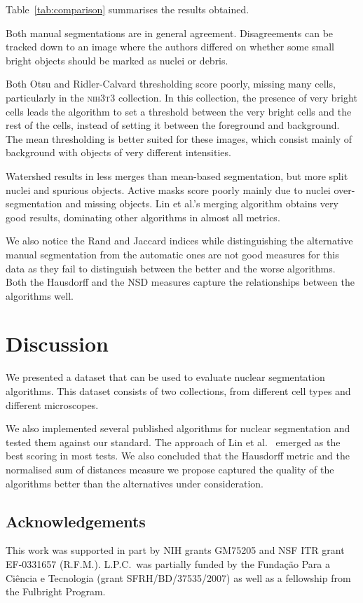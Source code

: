 \documentclass{article}
\newcommand*{\ttt}{\textsc{nih}{\footnotesize 3}\textsc{t}{\footnotesize 3}}
\begin{document}
Table~\ref{tab:comparison} summarises the results obtained.

Both manual segmentations are in general agreement. Disagreements can be tracked down to an image where the authors differed on whether some small bright objects should be marked as nuclei or debris.

Both Otsu and Ridler-Calvard thresholding score poorly, missing many cells, particularly in the \ttt{} collection. In this collection, the presence of very bright cells leads the algorithm to set a threshold between the very bright cells and the rest of the cells, instead of setting it between the foreground and background. The mean thresholding is better suited for these images, which consist mainly of background with objects of very different intensities.

Watershed results in less merges than mean-based segmentation, but more split nuclei and spurious objects. Active masks score poorly mainly due to nuclei over-segmentation and missing objects. Lin et al.'s merging algorithm obtains very good results, dominating other algorithms in almost all metrics.

We also notice the Rand and Jaccard indices while distinguishing the alternative manual segmentation from the automatic ones are not good measures for this data as they fail to distinguish between the better and the worse algorithms. Both the Hausdorff and the NSD measures capture the relationships between the algorithms well.

\section{Discussion}\label{sec:discussion}

We presented a dataset that can be used to evaluate nuclear segmentation algorithms. This dataset consists of two collections, from different cell types and different microscopes.

We also implemented several published algorithms for nuclear segmentation and tested them against our standard.  The approach of Lin et al.~\cite{LinRoysam} emerged as the best scoring in most tests. We also concluded that the Hausdorff metric and the normalised sum of distances measure we propose captured the quality of the algorithms better than the alternatives under consideration.

\subsection{Acknowledgements}

This work was supported in part by NIH grants GM75205 and NSF ITR  grant EF-0331657 (R.F.M.). L.P.C.\ was partially funded by the Funda\c c\~ao Para a Ci\^encia e Tecnologia (grant SFRH/BD/37535/2007) as well as a fellowship from the Fulbright Program.


\end{document}
